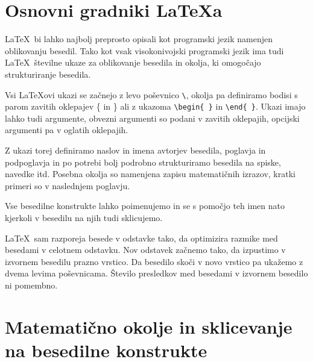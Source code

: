 \documentclass{feridiploma}
\begin{document}
	\chapter{Osnovni gradniki \LaTeX{a}}
	\label{ch0}
	
	\LaTeX\ bi lahko najbolj preprosto opisali kot programski jezik namenjen oblikovanju besedil.
	Tako kot vsak visokonivojski programski jezik ima tudi \LaTeX\  številne ukaze za oblikovanje  besedila in okolja, ki omogočajo strukturiranje besedila.
	
	Vsi \LaTeX ovi ukazi se začnejo z levo poševnico  \verb=\=, okolja pa definiramo bodisi s parom zavitih oklepajev \{ in \} ali z ukazoma \verb=\begin{ }= in   \verb=\end{ }=.
	Ukazi imajo lahko tudi argumente, obvezni argumenti so podani v zavitih oklepajih, opcijski argumenti pa v oglatih oklepajih.
	
	Z ukazi torej definiramo naslov in imena avtorjev besedila, poglavja in podpoglavja in po potrebi bolj podrobno strukturiramo besedila na spiske, navedke itd.
	Posebna okolja so namenjena zapisu matematičnih izrazov, kratki primeri so v naslednjem poglavju.
	
	Vse besedilne konstrukte lahko poimenujemo in se s pomočjo teh imen nato  kjerkoli v besedilu na njih  tudi sklicujemo.
	
	\LaTeX\ sam razporeja besede v odstavke tako, da optimizira razmike med besedami v celotnem odstavku.
	Nov odstavek začnemo tako, da izpustimo v izvornem besedilu prazno vrstico. Da besedilo skoči v novo vrstico pa ukažemo z dvema levima poševnicama.
	Število presledkov med besedami v izvornem besedilo ni pomembno.
	
	
	\chapter{Matematično okolje in sklicevanje na besedilne konstrukte}
	\label{ch1}
	
\end{document}
